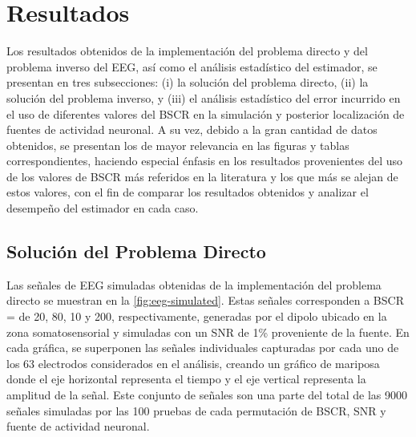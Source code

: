 %
\chapter{Resultados}
\label{sec:results}

Los resultados obtenidos de la implementación del problema directo y del problema inverso del EEG, así como el análisis estadístico del estimador, se presentan en tres subsecciones: (i) la solución del problema directo, (ii) la solución del problema inverso, y (iii) el análisis estadístico del error incurrido en el uso de diferentes valores del BSCR en la simulación y posterior localización de fuentes de actividad neuronal. 
A su vez, debido a la gran cantidad de datos obtenidos, se presentan los de mayor relevancia en las figuras y tablas correspondientes, haciendo especial énfasis en los resultados provenientes del uso de los valores de BSCR más referidos en la literatura y los que más se alejan de estos valores, con el fin de comparar los resultados obtenidos y analizar el desempeño del estimador en cada caso.

\section{Solución del Problema Directo}
\label{sec:results:direct}

Las señales de EEG simuladas obtenidas de la implementación del problema directo se muestran en la \cref{fig:eeg-simulated}. 
Estas señales corresponden a BSCR = de 20, 80, 10 y 200, respectivamente, generadas por el dipolo ubicado en la zona somatosensorial y simuladas con un SNR de 1\% proveniente de la fuente.
En cada gráfica, se superponen las señales individuales capturadas por cada uno de los 63 electrodos considerados en el análisis, creando un gráfico de mariposa donde el eje horizontal representa el tiempo y el eje vertical representa la amplitud de la señal. 
Este conjunto de señales son una parte del total de las 9000 señales simuladas por las 100 pruebas de cada permutación de BSCR, SNR y fuente de actividad neuronal.

